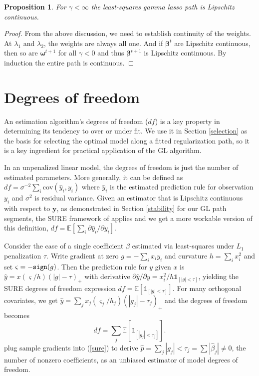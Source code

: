 \documentclass[12pt]{article}
\newtheorem{prop}{\sc Proposition}[section]
\newcommand{\bs}[1]{\boldsymbol{#1}}
\newcommand{\mr}[1]{\mathrm{#1}}
\newcommand{\bm}[1]{\mathbf{#1}}
\newcommand{\ds}[1]{\mathds{#1}}
\begin{document}
\begin{prop} For $\gamma<\infty$ the least-squares gamma lasso path is Lipschitz continuous. \end{prop} 
\begin{proof}
From the above discussion, we need to establish continuity of the weights.  At $\lambda_1$ and $\lambda_2$, the weights are always all one.  And if $\bs{\beta}^{t}$ are Lipschitz continuous,  then so are $\bs{\omega}^{t+1}$ for all $\gamma<0$ and thus $\bs{\beta}^{t+1}$ is Lipschitz continuous.  By induction the entire path is continuous.
\end{proof}

\section{Degrees of freedom}
\label{dof}

An estimation algorithm's degrees of freedom ($df$) is a key property in
determining its tendency to over or under fit.  We use it in Section
\ref{selection} as the  basis for selecting the optimal model along a
fitted regularization path, so it is a key ingredient for practical
application of the GL algorithm.  

In an unpenalized linear model, the degrees of freedom is just the number of
estimated parameters.  More generally, it can be defined as
\citep[e.g.][]{efron_least_2004} $df = \sigma^{-2} \sum_i \mr{cov}(\hat y_i,
y_i)$ where $\hat y_i$ is the estimated prediction rule for observation $y_i$
and $\sigma^2$ is residual variance. Given an estimator that is Lipschitz
continuous with respect to $\bm{y}$, as demonstrated in Section
\ref{stability} \citep[or in ][]{zou_one-step_2008} for our GL path segments,
the SURE framework of \cite{stein_estimation_1981} applies and we get a more
workable version of this definition,  $df = \ds{E}\left[\sum_i \partial \hat
y_i/\partial y_i\right]$.

Consider the case of a single coefficient $\beta$ estimated via least-squares
under $L_1$ penalization $\tau$.   Write gradient at zero $g = -\sum_i
x_iy_i$ and curvature $h = \sum_i x_i^2$ and set $\varsigma = -{\tt sign}(g)$.
Then the prediction rule for $y$ given $x$ is $\hat y =
x(\varsigma/h)(|g|-\tau)_+$ with  derivative $\partial \hat y/\partial y =
x_i^2/h \ds{1}_{[|g|<\tau]}$, yielding  the SURE degrees of freedom expression
$df = \ds{E}\left[ \ds{1}_{[|g|<\tau]} \right]$.   For many orthogonal
covariates, we get $\hat y = \sum_j x_j(\varsigma_j/h_j)(|g_j|-\tau_j)_+$ and
the degrees of freedom becomes  
\begin{equation} \label{sure} df = \sum_j
\ds{E}\left[ \ds{1}_{[|g_j|<\tau_j]} \right].
\end{equation}
\cite{zou_degrees_2007} plug sample gradients into (\ref{sure}) to derive
$\hat p = \sum_j |g_j| < \tau_j = \sum |\hat\beta_j| \neq 0$, the number of
nonzero  coefficients, as an unbiased estimator of model
degrees of freedom.
\end{document}
